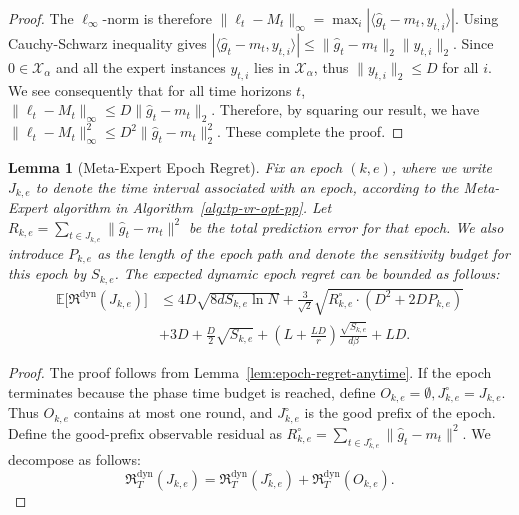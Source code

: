 \documentclass[journal,onecolumn]{IEEEtran}
\newcommand{\cX}{\mathcal{X}}
\theoremstyle{plain}
\newtheorem{lemma}[theorem]{Lemma}
\theoremstyle{definition}
\theoremstyle{remark}
\newcommand{\regret}{\mathfrak{R}}
\begin{document}
{\begin{proof}
    The $\ell_{\infty}$-norm is therefore $\|\ell_{t}-M_{t}\|_{\infty} = \max_{i}|\langle \hat{g}_{t}-m_{t}, y_{t,i}\rangle|$. Using Cauchy-Schwarz inequality gives $|\langle \hat{g}_{t}-m_{t},y_{t,i}\rangle| \le \|\hat{g}_{t}-m_{t}\|_{2}\|y_{t,i}\|_{2}$. Since $0 \in \cX_{\alpha}$ and all the expert instances $y_{t,i}$ lies in $\mathcal{X}_{\alpha}$, thus $\|y_{t,i}\|_{2} \le D$ for all $i$. We see consequently that for all time horizons $t$, $\|\ell_{t}-M_{t}\|_{\infty} \le D\|\hat{g}_{t}-m_{t}\|_{2}$. Therefore, by squaring our result, we have $\|\ell_{t} - M_{t}\|_{\infty}^{2} \le D^{2}\|\hat{g}_{t}-m_{t}\|_{2}^{2}$. These complete the proof.
\end{proof}

\begin{lemma}[Meta-Expert Epoch Regret]
\label{lem:dyn-epoch}
Fix an epoch $(k,e)$, where we write $J_{k,e}$ to denote the time interval associated with an epoch, according to the Meta-Expert algorithm in Algorithm~\ref{alg:tp-vr-opt-pp}. Let $R_{k,e} = \sum_{t \in J_{k,e}} \|\hat{g}_t - m_t\|^2$ be the total prediction error for that epoch. We also introduce $P_{k,e}$ as the length of the epoch path and denote the sensitivity budget for this epoch by $S_{k,e}$. 
The expected dynamic epoch regret can be bounded as follows:
\begin{align*}
\mathbb{E}\bigl[\regret^{\mathrm{dyn}}(J_{k,e})\bigr]
&\le 4 D \sqrt{8d S_{k,e} \ln N} + \frac{3}{\sqrt{2}}\sqrt{R_{k,e}^{\circ}\cdot(D^2 + 2D P_{k,e})} \\&+ 3D+\frac{D}{2}\sqrt{S_{k,e}}+\left(L+\frac{LD}{r}\right)\frac{\sqrt{S_{k,e}}}{d\beta}+LD.
\end{align*}
\end{lemma}

\begin{proof}
The proof follows from Lemma~\ref{lem:epoch-regret-anytime}. If the epoch terminates because the phase time budget is reached, define $O_{k,e}=\emptyset, J_{k,e}^{\circ}=J_{k,e}$.
Thus $O_{k,e}$ contains at most one round, and $J_{k,e}^{\circ}$ is the
good prefix of the epoch. Define the good-prefix observable residual as
$R_{k,e}^{\circ}=\sum_{t\in J_{k,e}^{\circ}}\|\hat g_t-m_t\|^2$. We decompose as follows:
\begin{equation*}
    \regret^{\mathrm{dyn}}_{T}(J_{k,e})=\regret^{\mathrm{dyn}}_{T}(J_{k,e}^{\circ})+\regret^{\mathrm{dyn}}_{T}(O_{k,e}).
\end{equation*}


\end{proof}}
\end{document}
